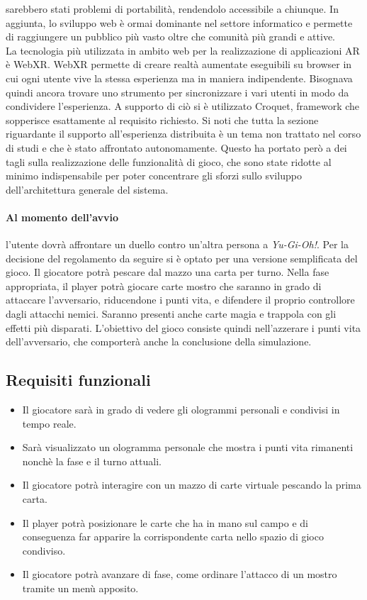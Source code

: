     sarebbero stati problemi di portabilità, rendendolo accessibile a chiunque. In aggiunta, lo sviluppo web è ormai dominante nel settore informatico e permette di raggiungere un pubblico
    più vasto oltre che comunità più grandi e attive.\\
    La tecnologia più utilizzata in ambito web per la realizzazione di applicazioni AR è WebXR. WebXR permette di creare realtà aumentate eseguibili su browser in cui ogni utente
    vive la stessa esperienza ma in maniera indipendente. Bisognava quindi ancora trovare uno strumento per sincronizzare i vari utenti in modo da condividere l'esperienza. A supporto 
    di ciò si è utilizzato Croquet, framework che sopperisce esattamente al requisito richiesto. Si noti che tutta la sezione riguardante il supporto all'esperienza distribuita è un tema
    non trattato nel corso di studi e che è stato affrontato autonomamente. Questo ha portato però a dei tagli sulla realizzazione delle funzionalità di gioco, che sono state ridotte
    al minimo indispensabile per poter concentrare gli sforzi sullo sviluppo dell'architettura generale del sistema.\\
    \newline
    \paragraph{Al momento dell'avvio} l'utente dovrà affrontare un duello contro un'altra persona a \textit{Yu-Gi-Oh!}. Per la decisione del regolamento da seguire si è optato per
    una versione semplificata del gioco. Il giocatore potrà pescare dal mazzo una carta per turno. Nella fase appropriata, il player potrà giocare carte mostro che saranno in grado di 
    attaccare l'avversario, riducendone i punti vita, e difendere il proprio controllore dagli attacchi nemici. Saranno presenti anche carte magia e trappola con gli effetti più disparati.
    L'obiettivo del gioco consiste quindi nell'azzerare i punti vita dell'avversario, che comporterà anche la conclusione della simulazione.

    \subsection{Requisiti funzionali}\label{subsec:requisitiFunzionali}
        \begin{itemize}
            \item Il giocatore sarà in grado di vedere gli ologrammi personali e condivisi in tempo reale.
            \item Sarà visualizzato un ologramma personale che mostra i punti vita rimanenti nonchè la fase e il turno attuali.
            \item Il giocatore potrà interagire con un mazzo di carte virtuale pescando la prima carta.
            \item Il player potrà posizionare le carte che ha in mano sul campo e di conseguenza far apparire la corrispondente carta nello spazio di gioco condiviso.
            \item Il giocatore potrà avanzare di fase, come ordinare l'attacco di un mostro tramite un menù apposito.
        \end{itemize}
